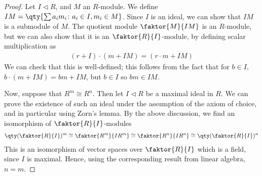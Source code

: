 \begin{proof}
	Let $I \triangleleft R$, and $M$ an $R$-module.
	We define $IM = \qty{\sum a_i m_i \colon a_i \in I, m_i \in M}$.
	Since $I$ is an ideal, we can show that $IM$ is a submodule of $M$.
	The quotient module $\faktor{M}{IM}$ is an $R$-module, but we can also show that it is an $\faktor{R}{I}$-module, by defining scalar multiplication as
	\begin{align*}
		(r+I) \cdot (m+IM) = (r \cdot m + IM)
	\end{align*}
	We can check that this is well-defined; this follows from the fact that for $b \in I$, $b \cdot (m + IM) = bm + IM$, but $b \in I$ so $bm \in IM$.

	Now, suppose that $R^m \cong R^n$.
	Then let $I \triangleleft R$ be a maximal ideal in $R$.
	We can prove the existence of such an ideal under the assumption of the axiom of choice, and in particular using Zorn's lemma.
	By the above discussion, we find an isomorphism of $\faktor{R}{I}$-modules
	\begin{align*}
		\qty(\faktor{R}{I})^m \cong \faktor{R^m}{IR^m} \cong \faktor{R^n}{IR^n} \cong \qty(\faktor{R}{I})^n
	\end{align*}
	This is an isomorphism of vector spaces over $\faktor{R}{I}$ which is a field, since $I$ is maximal.
	Hence, using the corresponding result from linear algebra, $n = m$.
\end{proof}

